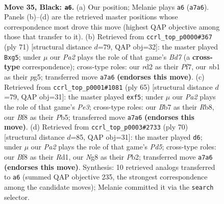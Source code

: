 \documentclass[11pt]{article}
\begin{document}
\clearpage

\begin{figure}[p]\centering
\begin{subfigure}{0.46\textwidth}\centering
\resizebox{\linewidth}{!}{%
\newchessgame
\chessboard[
  setfen={r4bn1/pbp1k3/2p1p3/R7/5P2/8/3R4/1NB1K3 b - - 1 35},
  showmover=false,
  pgfstyle=straightmove, color=movearrow, markmove={a7-a6}
]}
\caption{}
\end{subfigure}\hfill
\begin{subfigure}{0.46\textwidth}\centering
\resizebox{\linewidth}{!}{%
\newchessgame
\chessboard[
  setfen={1r4k1/5p2/4p3/4P1Pp/Np2R3/3r4/1R1b1B2/5K2 b - - 0 36},
  showmover=false,
  pgfstyle=straightmove, color=movearrow, markmove={d2-g5}
]}
\caption{}
\end{subfigure}
\\[4pt]
\begin{subfigure}{0.46\textwidth}\centering
\resizebox{\linewidth}{!}{%
\newchessgame
\chessboard[
  setfen={1r4k1/7p/2R1p3/1pp2P2/2b1B3/6bP/8/3R2K1 b - - 0 33},
  showmover=false,
  pgfstyle=straightmove, color=movearrow, markmove={e6-f5}
]}
\caption{}
\end{subfigure}\hfill
\begin{subfigure}{0.46\textwidth}\centering
\resizebox{\linewidth}{!}{%
\newchessgame
\chessboard[
  setfen={3r1rk1/1p6/p5pb/P2P4/8/R4B2/1P3P1P/3R3K w - - 1 36},
  showmover=false,
  pgfstyle=straightmove, color=movearrow, markmove={d5-d6}
]}
\caption{}
\end{subfigure}
\caption{\textbf{Move 35, Black: \texttt{a6}.} (a) Our position; Melanie plays \texttt{a6} (\texttt{a7a6}). Panels (b)--(d) are the retrieved master positions whose correspondence most drove this move (highest QAP objective among those that transfer to it). (b) Retrieved from \texttt{ccrl\_top\_p0000\#367} (ply 71) [structural distance $d$=79, QAP obj=32]: the master played \texttt{Bxg5}; under $\mu$ our \emph{Pa2} plays the role of that game's \emph{Bd7} (a \textbf{cross-type} correspondence); cross-type roles: our \emph{r}d2 as their \emph{P}f7, our \emph{n}b1 as their \emph{p}g5; transferred move \texttt{a7a6} \textbf{(endorses this move)}. (c) Retrieved from \texttt{ccrl\_top\_p0001\#1081} (ply 65) [structural distance $d$=79, QAP obj=31]: the master played \texttt{exf5}; under $\mu$ our \emph{Pa2} plays the role of that game's \emph{Pe3}; cross-type roles: our \emph{B}b7 as their \emph{R}b8, our \emph{B}f8 as their \emph{P}b5; transferred move \texttt{a7a6} \textbf{(endorses this move)}. (d) Retrieved from \texttt{ccrl\_top\_p0003\#2733} (ply 70) [structural distance $d$=85, QAP obj=31]: the master played \texttt{d6}; under $\mu$ our \emph{Pa2} plays the role of that game's \emph{Pd5}; cross-type roles: our \emph{B}f8 as their \emph{R}d1, our \emph{N}g8 as their \emph{P}b2; transferred move \texttt{a7a6} \textbf{(endorses this move)}. Synthesis: 10 retrieved analogs transferred to \texttt{a6} (summed QAP objective 235, the strongest correspondence among the candidate moves); Melanie committed it via the \texttt{search} selector.}
\label{fig:thought-m69}
\end{figure}
\end{document}
